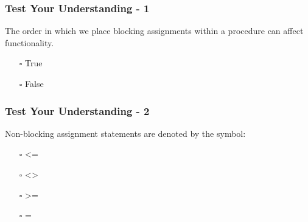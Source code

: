 \documentclass[t, notes, xcolor=table]{beamer}
\begin{document}
\begin{frame}
\frametitle{Test Your Understanding - 1}
The order in which we place blocking assignments within a procedure can affect functionality.
\begin{itemize}
\item[$\square$] True
\item[$\square$] False

\end{itemize}
\end{frame}

\begin{frame}
\frametitle{Test Your Understanding - 2}
Non-blocking assignment statements are denoted by the symbol:
\begin{itemize}
\item[$\square$] \textless =
\item[$\square$] \textless\textgreater
\item[$\square$] \textgreater =
\item[$\square$] =
\end{itemize}
\end{frame}
\end{document}
